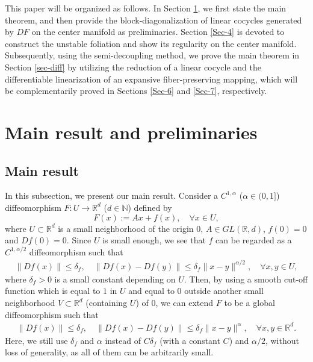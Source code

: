 \documentclass[reqno]{amsart}
\numberwithin{equation}{section}
\begin{document}
This paper will be organized as follows.
In Section \ref{Sec-ma}, we first state the main theorem, and then provide the block-diagonalization of linear cocycles generated by $DF$ on the center manifold as preliminaries.
Section \ref{Sec-4} is devoted to construct the unstable foliation and show its regularity on the center manifold. Subsequently, using the semi-decoupling method, we prove the main theorem in Section \ref{sec-diff} by utilizing the reduction of a linear cocycle and the differentiable linearization of an expansive fiber-preserving mapping, which will be complementarily proved in Sections \ref{Sec-6} and \ref{Sec-7}, respectively.

\section{Main result and preliminaries}\label{Sec-ma}

\subsection{Main result}
In this subsection, we present our main result.
Consider a
$C^{1,\alpha}$ ($\alpha\in (0,1]$) 
diffeomorphism
$F:U\to \mathbb{R}^d$ ($d\in \mathbb{N}$) defined by
\begin{equation}\label{NL-F}
F(x):=Ax+f(x), \quad \forall x\in U,
\end{equation}
where $U\subset \mathbb{R}^d$ is a small neighborhood of the origin $0$, $A\in GL(\mathbb{R},d)$, $f(0)=0$ and $Df(0)=0$. Since $U$ is small enough, we see that $f$ can be regarded as a $C^{1,\alpha/2}$ diffeomorphism such that
\begin{align*}
 \|Df(x)\| \le \delta_f, \quad 
 \|D  f(x)-D  f(y)\| \le \delta_f \|x-y\|^{\alpha/2},\quad \forall x,y\in U,
\end{align*}
where $\delta_f>0$ is a small constant depending on $U$.
Then, by using a smooth cut-off function which is equal to $1$ in $U$ and equal to $0$ outside another small neighborhood $V\subset \mathbb{R}^d$ (containing $U$) of $0$, we can extend $F$ to be a global diffeomorphism such that
\begin{align}\label{Df-hold-1}
 \|Df(x)\| \le \delta_f, \quad   
 \|D  f(x)-D  f(y)\| \le \delta_f \|x-y\|^\alpha,\quad \forall x,y\in\mathbb{R}^d.
\end{align}
Here, we still use $\delta_f$ and $\alpha$ instead of $C\delta_f$ (with a constant $C$) and $\alpha/2$, without loss of generality, as all of them can be arbitrarily small.
\end{document}
